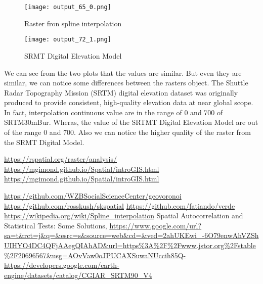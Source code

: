 \documentclass[11pt,a4paper]{article}
\begin{document}
\pagebreak 
\begin{figure}[!htb]
   \begin{minipage}{1\textwidth}
     \centering
     \texttt{[image: output\_65\_0.png]}
     \caption{Raster fron spline interpolation}\label{Fig:Data1}
   \end{minipage}\hfill
   \begin{minipage}{1\textwidth}
     \centering
     \texttt{[image: output\_72\_1.png]}
     \caption{SRMT Digital Elevation Model}\label{Fig:Data2}
   \end{minipage}
\end{figure}


  
   
    
    We can see from the two plots that the values are similar. But even they
are similar, we can notice some differences between the rasters object.
The Shuttle Radar Topography Mission (SRTM) digital elevation dataset was originally produced to provide consistent, high-quality elevation data at near global scope.\cite{srmt} \\
In fact, interpolation continuous value are in the range of 0 and 700 of SRTM30mBur. Wheras, the value of the SRTMT Digital Elevation Model are out of the range 0 and 700. Also we can notice the higher quality of the raster from the SRMT Digital Model. 


    \newpage
\begin{thebibliography}{9}
  	\url {https://rspatial.org/raster/analysis/}
  		\url{https://mgimond.github.io/Spatial/introGIS.html}
  	 \url {https://mgimond.github.io/Spatial/introGIS.html}
  		
	 \url{https://github.com/WZBSocialScienceCenter/geovoronoi}
	 \url{https://github.com/rosskush/skspatial}
	 \url{https://github.com/fatiando/verde}
	 \url {https://wikipedia.org/wiki/Spline_interpolation}
	 Spatial Autocorrelation and Statistical Tests: Some Solutions, \url{https://www.google.com/url?sa=t&rct=j&q=&esrc=s&source=web&cd=&ved=2ahUKEwi_-6O79enwAhVZShUIHYO4DC4QFjAAegQIAhAD&url=https%3A%2F%2Fwww.jstor.org%2Fstable%2F20696567&usg=AOvVaw0oJPUCAXSuwaNUccih85Q-}
	 \url {https://developers.google.com/earth-engine/datasets/catalog/CGIAR_SRTM90_V4}
\end{thebibliography}
    
    
    
\end{document}
